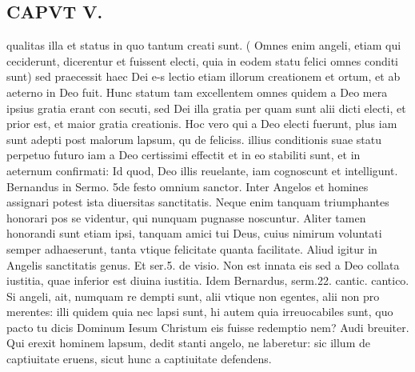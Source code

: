 \documentclass{article}
\begin{document}
\begin{pages}
\section*{CAPVT  V. }
\marginpar{[ p.335 ]}\pstart qualitas illa et status in quo tantum creati sunt. ( Omnes enim angeli, etiam qui ceciderunt, dicerentur et fuissent electi, quia in eodem statu felici omnes conditi sunt) sed praecessit haec Dei e-s lectio etiam illorum creationem et ortum, et ab aeterno in Deo fuit. Hunc statum tam excellentem omnes quidem a Deo mera ipsius gratia erant con secuti, sed Dei illa gratia per quam sunt alii dicti electi, et prior est, et maior gratia creationis. Hoc vero qui a Deo electi fuerunt, plus iam sunt adepti post malorum lapsum, qu de feliciss. illius conditionis suae statu perpetuo futuro iam a Deo certissimi effectit et in eo stabiliti sunt, et in aeternum confirmati: Id quod, Deo illis reuelante, iam cognoscunt et intelligunt. Bernandus in Sermo. 5de festo omnium sanctor. Inter Angelos et homines assignari potest ista diuersitas sanctitatis. Neque enim tanquam triumphantes honorari pos se videntur, qui nunquam pugnasse noscuntur. Aliter tamen honorandi sunt etiam ipsi, tanquam amici tui Deus, cuius nimirum voluntati semper adhaeserunt, tanta vtique felicitate quanta facilitate. Aliud igitur in Angelis sanctitatis genus. Et ser.5. de visio. Non est innata eis sed a Deo collata iustitia, quae inferior est diuina iustitia. Idem Bernardus, serm.22. cantic. cantico. Si angeli, ait, numquam re dempti sunt, alii vtique non egentes, alii non pro merentes: illi quidem quia nec lapsi sunt, hi autem quia irreuocabiles sunt, quo pacto tu dicis Dominum Iesum Christum eis fuisse redemptio nem? Audi breuiter. Qui erexit hominem lapsum, dedit stanti angelo, ne laberetur: sic illum de captiuitate eruens, sicut hunc a captiuitate defendens.  \pend

\end{pages}
\end{document}
